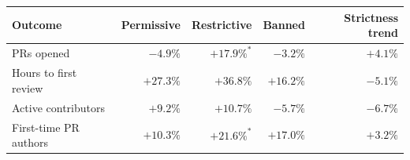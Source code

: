 \begin{tabular}{lrrrr}
\toprule
Outcome & Permissive & Restrictive & Banned & Strictness trend \\
\midrule
PRs opened & $-4.9\%$ & $+17.9\%^{*}$ & $-3.2\%$ & $+4.1\%$ \\
Hours to first review & $+27.3\%$ & $+36.8\%$ & $+16.2\%$ & $-5.1\%$ \\
Active contributors & $+9.2\%$ & $+10.7\%$ & $-5.7\%$ & $-6.7\%$ \\
First-time PR authors & $+10.3\%$ & $+21.6\%^{*}$ & $+17.0\%$ & $+3.2\%$ \\
\bottomrule
\end{tabular}

